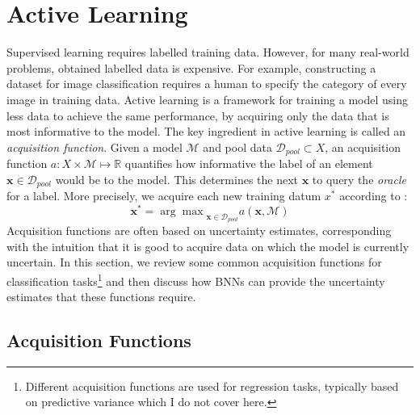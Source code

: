 \documentclass[11pt, a4paper, bibliography=totoc]{report}
\newcommand{\reals}{\mathbb{R}}
\newcommand{\x}{\mathbf{x}}
\begin{document}
\chapter{Active Learning}
Supervised learning requires labelled training data. However, for many real-world problems, obtained labelled data is expensive. For example, constructing a dataset for image classification requires a human to specify the category of every image in training data. Active learning \cite{cohn1996active} is a framework for training a model using less data to achieve the same performance, by acquiring only the data that is most informative to the model. The key ingredient in active learning is called an \textit{acquisition function}. Given a model $ \mathcal{M} $ and pool data $ \mathcal{D}_{pool} \subset X $, an acquisition function $ a : X \times \mathcal{M} \mapsto \reals $ quantifies how informative the label of an element $ \x \in \mathcal{D}_{pool} $ would be to the model. This determines the next $ \x $ to query the \textit{oracle} for a label. More precisely, we acquire each new training datum $ x^* $ according to \cite{Gal2017b}:
\[ \x^* = {\arg\max}_{\x \in \mathcal{D}_{pool}} a(\x, \mathcal{M}) \]
Acquisition functions are often based on uncertainty estimates, corresponding with the intuition that it is good to acquire data on which the model is currently uncertain. In this section, we review some common acquisition functions for classification tasks\footnote{Different acquisition functions are used for regression tasks, typically based on predictive variance \cite[p.~47]{Gal2017a} which I do not cover here.} and then discuss how BNNs can provide the uncertainty estimates that these functions require. %

\section{Acquisition Functions} \label{sec:acq_funcs}
\end{document}

